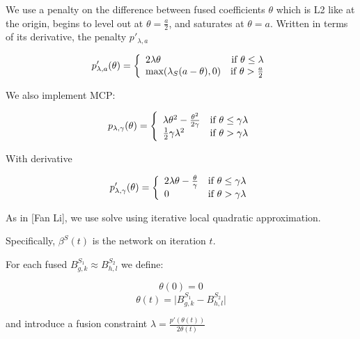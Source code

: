 \documentclass[11pt]{article}
\begin{document}
We use a penalty on the difference between fused coefficients $\theta$ which is L2 like at the origin, begins to level out at $\theta = \frac{a}{2}$, and saturates at $\theta = a$. Written in terms of its derivative, the penalty $p'_{\lambda, a}$

\begin{equation}
p'_{\lambda,a}(\theta) = \left\{
    \begin{array}{lr}
    2\lambda\theta & \text{if } \theta \leq \lambda\\
    \text{max}(\lambda_S(a-\theta),0) & \text{if } \theta > {a \over 2}
    \end{array}
    \right.
\end{equation}

We also implement MCP:

\begin{equation}
p_{\lambda,\gamma}(\theta) = \left\{
    \begin{array}{lr}
    \lambda\theta^2-{ \theta^2 \over 2\gamma} & \text{if } \theta \leq \gamma\lambda\\
    {1 \over 2}\gamma\lambda^2 & \text{if } \theta > \gamma\lambda
    \end{array}
    \right. 
\end{equation}

With derivative

\begin{equation}
p'_{\lambda,\gamma}(\theta) = \left\{
    \begin{array}{lr}
    2\lambda\theta - {\theta \over \gamma} & \text{if } \theta \leq \gamma\lambda\\
    0 & \text{if } \theta > \gamma\lambda
    \end{array}
    \right.
\end{equation}
    
As in [Fan Li], we use solve using iterative local quadratic approximation. 

Specifically, $\beta^S(t)$ is the network on iteration $t$. 

For each fused $B^{S_1}_{g,k} \approx B^{S_2}_{h,l}$ we define:

\begin{equation} 
\theta(0)=0
\end{equation}
\begin{equation}
\theta(t) = \vert B^{S_1}_{g,k} - B^{S_2}_{h,l} \vert
\end{equation}

and introduce a fusion constraint $\lambda = \frac{p'(\theta(t))}{2\theta(t)} $
\end{document}
